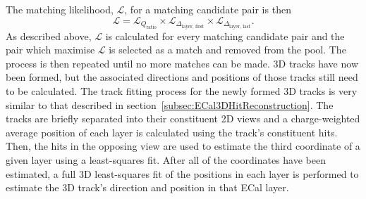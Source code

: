 \newline
\newline
The matching likelihood, $\mathcal{L}$, for a matching candidate pair is then
\begin{equation}
  \mathcal{L} = \mathcal{L}_{Q_{\textrm{ratio}}} \times \mathcal{L}_{\Delta_{\textrm{layer, first}}} \times \mathcal{L}_{\Delta_{\textrm{layer, last}}}.
\end{equation}
As described above, $\mathcal{L}$ is calculated for every matching candidate pair and the pair which maximise $\mathcal{L}$ is selected as a match and removed from the pool.  The process is then repeated until no more matches can be made.
\newline
\newline
3D tracks have now been formed, but the associated directions and positions of those tracks still need to be calculated.  The track fitting process for the newly formed 3D tracks is very similar to that described in section~\ref{subsec:ECal3DHitReconstruction}.  The tracks are briefly separated into their constituent 2D views and a charge-weighted average position of each layer is calculated using the track's constituent hits.  Then, the hits in the opposing view are used to estimate the third coordinate of a given layer using a least-squares fit.  After all of the coordinates have been estimated, a full 3D least-squares fit of the positions in each layer is performed to estimate the 3D track's direction and position in that ECal layer.

